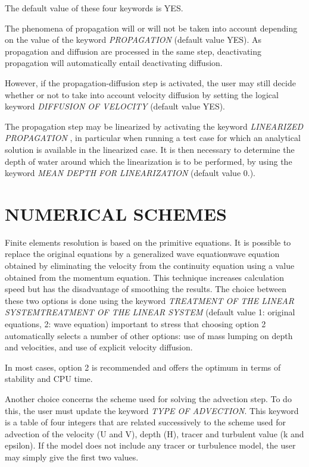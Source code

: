  The default value of these four keywords is YES.

 The phenomena of propagation will or will not be taken into account depending on the value of the keyword  \textit{PROPAGATION} (default value YES). As propagation and diffusion are processed in the same step, deactivating propagation will automatically entail deactivating diffusion.

 However, if the propagation-diffusion step is activated, the user may still decide whether or not to take into account velocity diffusion by setting the logical keyword \textit{DIFFUSION OF VELOCITY}  (default value YES).

 The propagation step may be linearized by activating the keyword \textit{LINEARIZED PROPAGATION }, in particular when running a test case for which an analytical solution is available in the linearized case. It is then necessary to determine the depth of water around which the linearization is to be performed, by using the keyword \textit{MEAN DEPTH FOR LINEARIZATION}  (default value 0.).


\section{ NUMERICAL SCHEMES}

 Finite elements resolution is based on the primitive equations. It is possible to replace the original equations by a generalized wave equationwave equation obtained by eliminating the velocity from the continuity equation using a value obtained from the momentum equation. This technique increases calculation speed but has the disadvantage of smoothing the results. The choice between these two options is done using the keyword \textit{TREATMENT OF THE LINEAR SYSTEMTREATMENT OF THE LINEAR SYSTEM} (default value 1: original equations, 2: wave equation) important to stress that choosing option 2 automatically selects a number of other options: use of mass lumping on depth and velocities, and use of explicit velocity diffusion.

 In most cases, option 2 is recommended and offers the optimum in terms of stability and CPU time.

 Another choice concerns the scheme used for solving the advection step. To do this, the user must update the keyword \textit{TYPE OF ADVECTION}. This keyword is a table of four integers that are related successively to the scheme used for advection of the velocity (U and V), depth (H), tracer and turbulent value (k and epsilon). If the model does not include any tracer or turbulence model, the user may simply give the first two values.

